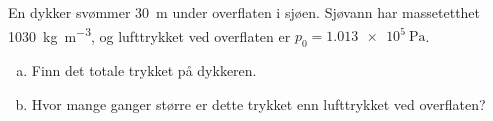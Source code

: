 %
En dykker svømmer \SI{30}{\metre} under overflaten i sjøen. Sjøvann har massetetthet \SI{1030}{\kilo\gram\per\metre\cubed}, og lufttrykket ved overflaten er $p_0 = \SI{1.013e5}{\pascal}$.
\begin{enumerate}[a)]
    \item Finn det totale trykket på dykkeren.
    \item Hvor mange ganger større er dette trykket enn lufttrykket ved overflaten?
\end{enumerate}
%
